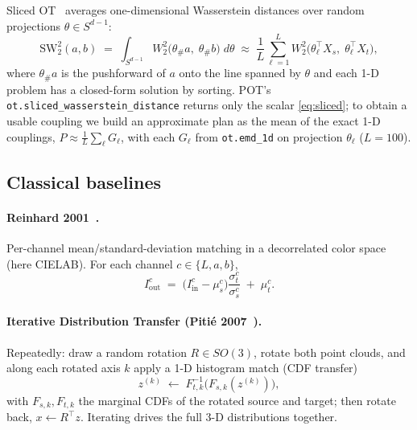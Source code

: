 \documentclass[11pt,a4paper]{article}
\newcommand{\code}[1]{\texttt{#1}}
\begin{document}
Sliced OT~\cite{bonneel2015} averages one-dimensional Wasserstein distances over
random projections $\theta \in S^{d-1}$:
\begin{equation}
  \label{eq:sliced}
  \mathrm{SW}_2^2(a,b)
  \;=\; \int_{S^{d-1}} W_2^2\bigl(\theta_\# a,\; \theta_\# b\bigr)\; d\theta
  \;\approx\; \frac{1}{L}\sum_{\ell=1}^{L}
  W_2^2\bigl(\theta_\ell^{\!\top} X_s,\; \theta_\ell^{\!\top} X_t\bigr),
\end{equation}
where $\theta_\# a$ is the pushforward of $a$ onto the line spanned by $\theta$
and each 1-D problem has a closed-form solution by sorting.
POT's \code{ot.sliced\_wasserstein\_distance} returns only the scalar
\cref{eq:sliced}; to obtain a usable coupling we build an approximate plan as the
mean of the exact 1-D couplings,
$P \approx \frac{1}{L}\sum_\ell G_\ell$, with each
$G_\ell$ from \code{ot.emd\_1d} on projection $\theta_\ell$ ($L = 100$).

\subsection{Classical baselines}

\paragraph{Reinhard 2001~\cite{reinhard2001}.} Per-channel
mean/standard-deviation matching in a decorrelated color space (here CIELAB).
For each channel $c \in \{L,a,b\}$,
\begin{equation}
  \label{eq:reinhard}
  I^{c}_{\text{out}}
  \;=\; \bigl(I^{c}_{\text{in}} - \mu^{c}_s\bigr)
        \frac{\sigma^{c}_t}{\sigma^{c}_s}
        \;+\; \mu^{c}_t .
\end{equation}

\paragraph{Iterative Distribution Transfer (Piti\'e 2007~\cite{pitie2007idt}).}
Repeatedly: draw a
random rotation $R \in SO(3)$, rotate both point clouds, and along each rotated
axis $k$ apply a 1-D histogram match (CDF transfer)
\begin{equation}
  \label{eq:idt}
  z^{(k)} \;\leftarrow\; F_{t,k}^{-1}\!\bigl(F_{s,k}(z^{(k)})\bigr),
\end{equation}
with $F_{s,k}, F_{t,k}$ the marginal CDFs of the rotated source and target;
then rotate back, $x \leftarrow R^\top z$. Iterating drives the full 3-D
distributions together.
\end{document}
